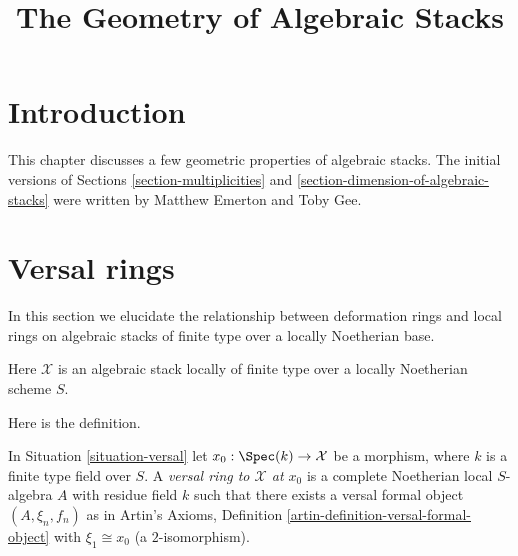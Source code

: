 

%


\title{The Geometry of Algebraic Stacks}


\maketitle

\label{section-phantom}

\tableofcontents

\section{Introduction}
\label{section-introduction}

\noindent
This chapter discusses a few geometric properties of algebraic stacks.
The initial versions of Sections \ref{section-multiplicities} and
\ref{section-dimension-of-algebraic-stacks}
were written by Matthew Emerton and Toby Gee.







\section{Versal rings}
\label{section-versal}

\noindent
In this section we elucidate the relationship between deformation rings
and local rings on algebraic stacks of finite type over a locally
Noetherian base.

\begin{situation}
\label{situation-versal}
Here $\mathcal{X}$ is an algebraic stack locally of finite type
over a locally Noetherian scheme $S$.
\end{situation}

\noindent
Here is the definition.

\begin{definition}
\label{definition-versal-ring-at-x}
In Situation \ref{situation-versal} let $x_0 : \Spec(k) \to \mathcal{X}$
be a morphism, where $k$ is a finite type field over $S$.
A {\it versal ring to $\mathcal{X}$ at $x_0$} is a complete
Noetherian local $S$-algebra $A$ with residue field $k$
such that there exists a versal formal object
$(A, \xi_n, f_n)$ as in Artin's Axioms, Definition
\ref{artin-definition-versal-formal-object}
with $\xi_1 \cong x_0$ (a $2$-isomorphism).
\end{definition}

